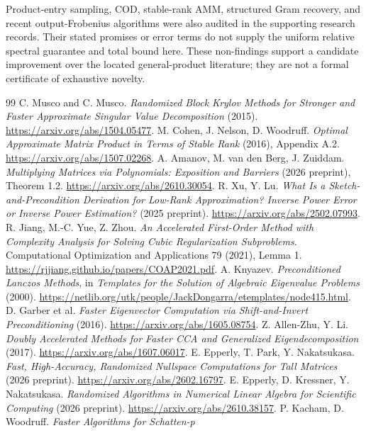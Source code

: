 \documentclass[11pt]{article}
\begin{document}
Product-entry sampling, COD, stable-rank AMM, structured Gram recovery,
and recent output-Frobenius algorithms were also audited in the supporting
research records. Their stated promises or error terms do not supply the
uniform relative spectral guarantee and total bound here. These non-findings
support a candidate improvement over the located general-product literature;
they are not a formal certificate of exhaustive novelty.

\begin{thebibliography}{99}
 C. Musco and C. Musco. \emph{Randomized Block Krylov Methods
for Stronger and Faster Approximate Singular Value Decomposition} (2015).
\url{https://arxiv.org/abs/1504.05477}.
 M. Cohen, J. Nelson, D. Woodruff. \emph{Optimal Approximate
Matrix Product in Terms of Stable Rank} (2016), Appendix A.2.
\url{https://arxiv.org/abs/1507.02268}.
 A. Amanov, M. van den Berg, J. Zuiddam.
\emph{Multiplying Matrices via Polynomials: Exposition and Barriers}
(2026 preprint), Theorem 1.2.
\url{https://arxiv.org/abs/2610.30054}.
 R. Xu, Y. Lu. \emph{What Is a Sketch-and-Precondition
Derivation for Low-Rank Approximation? Inverse Power Error or Inverse Power
Estimation?} (2025 preprint).
\url{https://arxiv.org/abs/2502.07993}.
 R. Jiang, M.-C. Yue, Z. Zhou.
\emph{An Accelerated First-Order Method with Complexity Analysis for Solving
Cubic Regularization Subproblems}. Computational Optimization and Applications
79 (2021), Lemma 1.
\url{https://rjjiang.github.io/papers/COAP2021.pdf}.
 A. Knyazev. \emph{Preconditioned Lanczos Methods}, in
\emph{Templates for the Solution of Algebraic Eigenvalue Problems} (2000).
\url{https://netlib.org/utk/people/JackDongarra/etemplates/node415.html}.
 D. Garber et al. \emph{Faster Eigenvector Computation via
Shift-and-Invert Preconditioning} (2016).
\url{https://arxiv.org/abs/1605.08754}.
 Z. Allen-Zhu, Y. Li. \emph{Doubly Accelerated Methods for
Faster CCA and Generalized Eigendecomposition} (2017).
\url{https://arxiv.org/abs/1607.06017}.
 E. Epperly, T. Park, Y. Nakatsukasa.
\emph{Fast, High-Accuracy, Randomized Nullspace Computations for Tall Matrices}
(2026 preprint).
\url{https://arxiv.org/abs/2602.16797}.
 E. Epperly, D. Kressner, Y. Nakatsukasa.
\emph{Randomized Algorithms in Numerical Linear Algebra for Scientific Computing}
(2026 preprint).
\url{https://arxiv.org/abs/2610.38157}.
 P. Kacham, D. Woodruff. \emph{Faster Algorithms for Schatten-p
}
\end{thebibliography}
\end{document}
